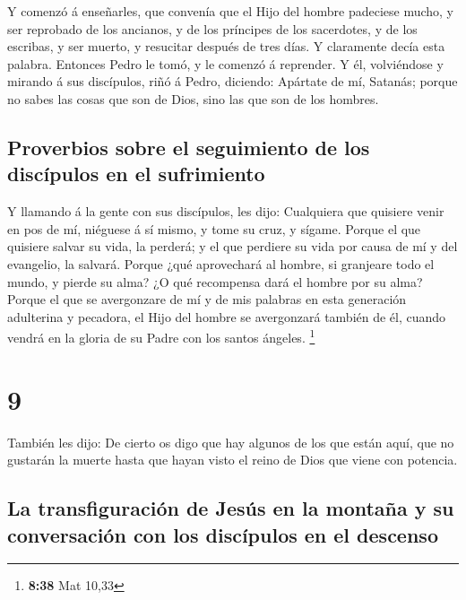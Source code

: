  Y comenzó á enseñarles, que convenía que el Hijo del
hombre padeciese mucho, y ser reprobado de los ancianos, y de los
príncipes de los sacerdotes, y de los escribas, y ser muerto, y
resucitar después de tres días.  Y claramente decía esta
palabra. Entonces Pedro le tomó, y le comenzó á reprender.
 Y él, volviéndose y mirando á sus discípulos, riñó á
Pedro, diciendo: Apártate de mí, Satanás; porque no sabes las cosas que
son de Dios, sino las que son de los hombres.

\hypertarget{proverbios-sobre-el-seguimiento-de-los-discuxedpulos-en-el-sufrimiento}{%
\subsection{Proverbios sobre el seguimiento de los discípulos en el
sufrimiento}\label{proverbios-sobre-el-seguimiento-de-los-discuxedpulos-en-el-sufrimiento}}

 Y llamando á la gente con sus discípulos, les dijo:
Cualquiera que quisiere venir en pos de mí, niéguese á sí mismo, y tome
su cruz, y sígame.  Porque el que quisiere salvar su
vida, la perderá; y el que perdiere su vida por causa de mí y del
evangelio, la salvará.  Porque ¿qué aprovechará al
hombre, si granjeare todo el mundo, y pierde su alma?  ¿O
qué recompensa dará el hombre por su alma?  Porque el que
se avergonzare de mí y de mis palabras en esta generación adulterina y
pecadora, el Hijo del hombre se avergonzará también de él, cuando vendrá
en la gloria de su Padre con los santos ángeles. \footnote{\textbf{8:38}
  Mat 10,33}

\hypertarget{section-8}{%
\section{9}\label{section-8}}

 También les dijo: De cierto os digo que hay algunos de
los que están aquí, que no gustarán la muerte hasta que hayan visto el
reino de Dios que viene con potencia.

\hypertarget{la-transfiguraciuxf3n-de-jesuxfas-en-la-montauxf1a-y-su-conversaciuxf3n-con-los-discuxedpulos-en-el-descenso}{%
\subsection{La transfiguración de Jesús en la montaña y su conversación
con los discípulos en el
descenso}\label{la-transfiguraciuxf3n-de-jesuxfas-en-la-montauxf1a-y-su-conversaciuxf3n-con-los-discuxedpulos-en-el-descenso}}

